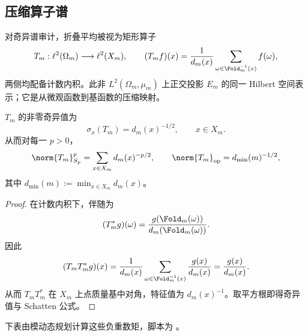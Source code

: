 \documentclass[../../main.tex]{subfiles}
\begin{document}




\subsection{压缩算子谱}

对奇异谱审计，折叠平均被视为矩形算子
\[
    T_m:\ell^2(\Omega_m)\longrightarrow \ell^2(X_m),
    \qquad
    (T_mf)(x)=\frac{1}{d_m(x)}
    \sum_{\omega\in\Fold_m^{-1}(x)}f(\omega),
\]
两侧均配备计数内积。此非 \(L^2(\Omega_m,\mu_m)\) 上正交投影 \(E_m\) 的同一 Hilbert 空间表示；它是从微观函数到基函数的压缩映射。

\begin{proposition}[折叠压缩的奇异值]\label{prop:fold-condexp-singular-values}
\(T_m\) 的非零奇异值为
\[
    \sigma_x(T_m)=d_m(x)^{-1/2},
    \qquad x\in X_m.
\]
从而对每一 \(p>0\)，
\[
    \norm{T_m}_{S_p}^p=\sum_{x\in X_m}d_m(x)^{-p/2},
    \qquad
    \norm{T_m}_{\mathrm{op}}=d_{\min}(m)^{-1/2},
\]
其中 \(d_{\min}(m):=\min_{x\in X_m}d_m(x)\)。
\end{proposition}

\begin{proof}
在计数内积下，伴随为
\[
    (T_m^\ast g)(\omega)=\frac{g(\Fold_m(\omega))}{d_m(\Fold_m(\omega))}.
\]
因此
\[
    (T_mT_m^\ast g)(x)
    =
    \frac{1}{d_m(x)}
    \sum_{\omega\in\Fold_m^{-1}(x)}
    \frac{g(x)}{d_m(x)}
    =
    \frac{g(x)}{d_m(x)} .
\]
从而 \(T_mT_m^\ast\) 在 \(X_m\) 上点质量基中对角，特征值为 \(d_m(x)^{-1}\)。取平方根即得奇异值与 Schatten 公式。
\end{proof}

下表由模动态规划计算这些负重数矩，脚本为
\texttt{}。


\end{document}
